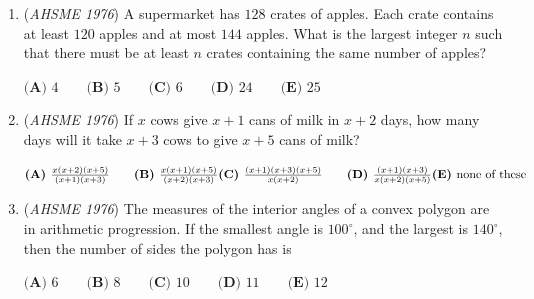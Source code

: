 \begin{enumerate}
 $\begin{array}{l}\textbf{I. }\text{"If the wild pig on planet beta has a long nose, then the pink elephant on planet alpha has purple eyes."}\\ \textbf{II. }\text{"If the pink elephant on planet alpha does not have purple eyes, then the wild pig on planet beta does not have a long nose."}\\ \textbf{III. }\text{"If the wild pig on planet beta has a long nose, then the pink elephant on planet alpha does not have purple eyes."}\\ \textbf{IV. }\text{"The pink elephant on planet alpha does not have purple eyes, or the wild pig on planet beta does not have a long nose."}\end{array}$
$\textbf{(A) }\textbf{I. }\text{and }\textbf{II. }\text{only}\qquad \textbf{(B) }\textbf{III. }\text{and }\textbf{IV. }\text{only}\qquad \textbf{(C) }\textbf{II. }\text{and }\textbf{IV. }\text{only}\qquad \textbf{(D) }\textbf{II. }\text{and }\textbf{III. }\text{only}\qquad \textbf{(E) }\textbf{III. }\text{only}$


	\item (\textit{AHSME 1976}) A supermarket has $128$ crates of apples. Each crate contains at least $120$ apples and at most $144$ apples. 
What is the largest integer $n$ such that there must be at least $n$ crates containing the same number of apples?


 $\textbf{(A) }4\qquad \textbf{(B) }5\qquad \textbf{(C) }6\qquad \textbf{(D) }24\qquad  \textbf{(E) }25$


	\item (\textit{AHSME 1976}) If $x$ cows give $x+1$ cans of milk in $x+2$ days, how many days will it take $x+3$ cows to give $x+5$ cans of milk?


 $\textbf{(A) }\frac{x(x+2)(x+5)}{(x+1)(x+3)}\qquad \textbf{(B) }\frac{x(x+1)(x+5)}{(x+2)(x+3)}\qquad\\ \textbf{(C) }\frac{(x+1)(x+3)(x+5)}{x(x+2)}\qquad \textbf{(D) }\frac{(x+1)(x+3)}{x(x+2)(x+5)}\qquad \\ \textbf{(E) }\text{none of these}$


	\item (\textit{AHSME 1976}) The measures of the interior angles of a convex polygon are in arithmetic progression. 
If the smallest angle is $100^\circ$, and the largest is $140^\circ$, then the number of sides the polygon has is 


 $\textbf{(A) }6\qquad \textbf{(B) }8\qquad \textbf{(C) }10\qquad \textbf{(D) }11\qquad  \textbf{(E) }12$



\end{enumerate}
